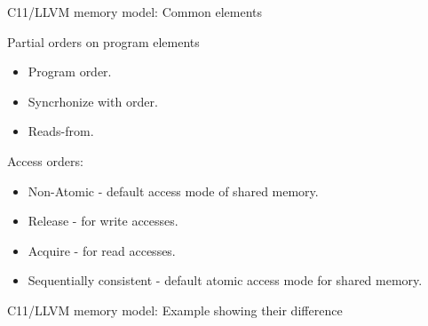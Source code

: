\documentclass[xcolor=dvipsnames, notes]{beamer}
\begin{document}
    \begin{frame}{C11/LLVM memory model: Common elements}

        Partial orders on program elements
        \begin{itemize}
            \item Program order. 
            \item Syncrhonize with order.
            \item Reads-from. 
        \end{itemize}

        Access orders:
        \begin{itemize}
            \item Non-Atomic - default access mode of shared memory.
            \item Release - for write accesses. 
            \item Acquire - for read accesses. 
            \item Sequentially consistent - default atomic access mode for shared memory.
        \end{itemize}

    \end{frame}

    \begin{frame}{C11/LLVM memory model: Example showing their difference}
        
        \begin{figure}
        \end{figure}

    \end{frame}
\end{document}
